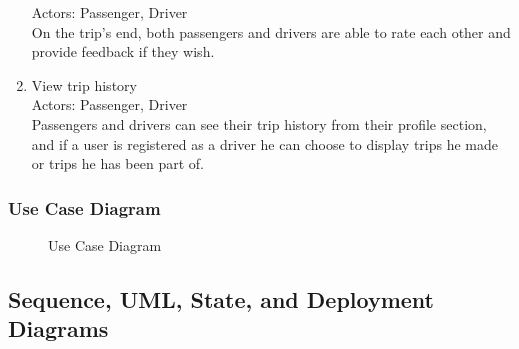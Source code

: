 \documentclass[a4paper, 12pt]{report} %
\begin{document}
\begin{enumerate}
                    Actors: Passenger, Driver\\
                    On the trip's end, both passengers and drivers are able to rate each other and provide feedback if they wish.
                \item View trip history \\
                    Actors: Passenger, Driver \\
                    Passengers and drivers can see their trip history from their profile section, and if a user is registered as a driver he can choose to display trips he made or trips he has been part of.
            \end{enumerate}
        
        \pagebreak
        \subsubsection{Use Case Diagram}

            \begin{figure}[H]
                \centering
                \caption{Use Case Diagram}
                \label{fig:usecase}
            \end{figure}

    \pagebreak
    \subsection{Sequence, UML, State, and Deployment Diagrams}
\end{document}
